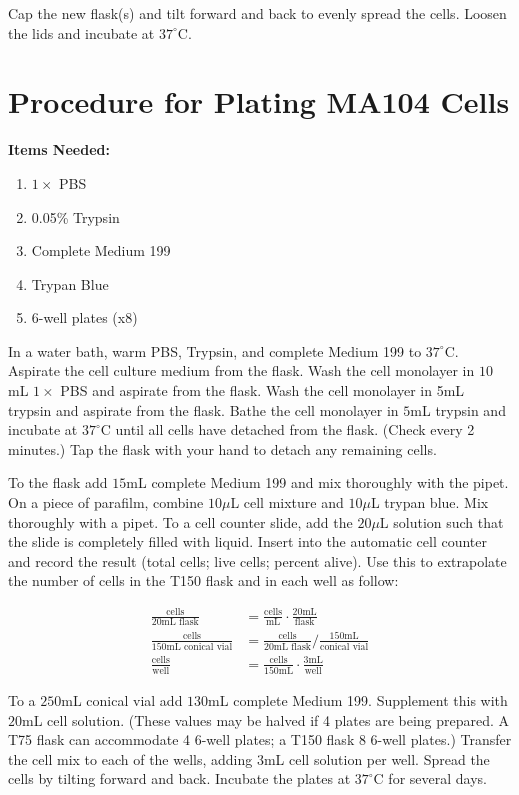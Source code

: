 Cap the new flask(s) and tilt forward and back to evenly spread the cells. Loosen the lids and incubate at $37^{\circ}$C.

\section{Procedure for Plating MA104 Cells}

{\bfseries Items Needed:} \begin{enumerate}
	\item $1\times$ PBS
	\item 0.05\% Trypsin
	\item Complete Medium 199
	\item Trypan Blue
	\item 6-well plates (x8)
\end{enumerate}

In a water bath, warm PBS, Trypsin, and complete Medium 199 to $37^{\circ}$C. Aspirate the cell culture medium from the flask. Wash the cell monolayer in $10$mL $1\times$ PBS and aspirate from the flask. Wash the cell monolayer in 5mL trypsin and aspirate from the flask. Bathe the cell monolayer in $5$mL trypsin and incubate at $37^{\circ}$C until all cells have detached from the flask. (Check every 2 minutes.) Tap the flask with your hand to detach any remaining cells.

To the flask add $15$mL complete Medium 199 and mix thoroughly with the pipet. On a piece of parafilm, combine $10\mu$L cell mixture and $10\mu$L trypan blue. Mix thoroughly with a pipet. To a cell counter slide, add the $20\mu$L solution such that the slide is completely filled with liquid. Insert into the automatic cell counter and record the result (total cells; live cells; percent alive). Use this to extrapolate the number of cells in the T150 flask and in each well as follow:

\begin{align*}
\frac{\text{cells}}{20\text{mL flask}} &= \frac{\text{cells}}{\text{mL}}\cdot \frac{20\text{mL}}{\text{flask}}\\
\frac{\text{cells}}{150\text{mL conical vial}} &= \frac{\text{cells}}{20\text{mL flask}}/\frac{150\text{mL}}{\text{conical vial}}\\
\frac{\text{cells}}{\text{well}} &= \frac{\text{cells}}{150\text{mL}}\cdot\frac{3\text{mL}}{\text{well}}
\end{align*}

To a $250$mL conical vial add $130$mL complete Medium 199. Supplement this with $20$mL cell solution. (These values may be halved if 4 plates are being prepared. A T75 flask can accommodate 4 6-well plates; a T150 flask 8 6-well plates.) Transfer the cell mix to each of the wells, adding $3$mL cell solution per well. Spread the cells by tilting forward and back. Incubate the plates at $37^{\circ}$C for several days.

